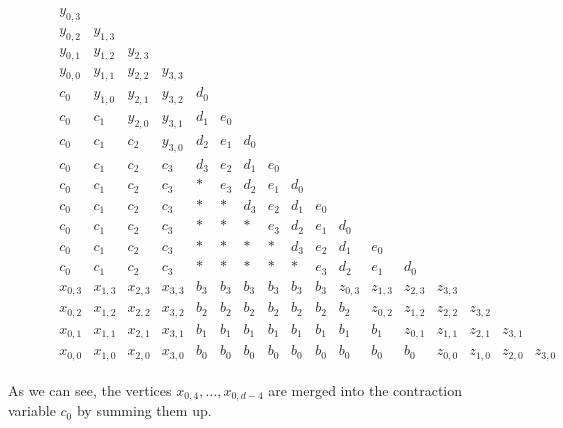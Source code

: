 \begin{figure}[H]
    \begin{align*}
        \begin{array}{cccccccccccccccccccc}
            y_{0,3} & & & & & & & & & & & & \\
            y_{0,2} & y_{1,3} & & & & & & & & & & & \\
            y_{0,1} & y_{1,2} & y_{2,3} & & & & & & & & & & \\
            y_{0,0} & y_{1,1} & y_{2,2} & y_{3,3} & & & & & & & & & \\
            c_0 & y_{1,0} & y_{2,1} & y_{3,2} & d_0 & & & & & & & & \\
            c_0 & c_1 & y_{2,0} & y_{3,1} & d_1 & e_0 & & & & & & & \\
            c_0 & c_1 & c_2 & y_{3,0} & d_2 & e_1 & d_0 & & & & & & \\
            c_0 & c_1 & c_2 & c_3 & d_3 & e_2 & d_1 & e_0 & & & & & \\
            c_0 & c_1 & c_2 & c_3 &  *  & e_3 & d_2 & e_1 & d_0 & & & & \\
            c_0 & c_1 & c_2 & c_3 &  *  & * & d_3 & e_2 & d_1 & e_0 & & & \\
            c_0 & c_1 & c_2 & c_3 &  *  & * & * & e_3 & d_2 & e_1 & d_0 & & \\
            c_0 & c_1 & c_2 & c_3 &  *  & * & * & * & d_3 & e_2 & d_1 & e_0 & \\
            c_0 & c_1 & c_2 & c_3 &  *  & * & * & * & * & e_3 & d_2 & e_1 & d_0 \\
            x_{0,3} & x_{1,3} & x_{2,3} & x_{3,3} & b_3 & b_3 & b_3 & b_3 & b_3 & b_3 & z_{0,3} & z_{1,3} & z_{2,3} & z_{3,3} \\
            x_{0,2} & x_{1,2} & x_{2,2} & x_{3,2} & b_2 & b_2 & b_2 & b_2 & b_2 & b_2 & b_2 & z_{0,2} & z_{1,2} & z_{2,2} & z_{3,2} \\
            x_{0,1} & x_{1,1} & x_{2,1} & x_{3,1} & b_1 & b_1 & b_1 & b_1 & b_1 & b_1 & b_1 & b_1 & z_{0,1} & z_{1,1} & z_{2,1} & z_{3,1} \\
            x_{0,0} & x_{1,0} & x_{2,0} & x_{3,0} & b_0 & b_0 & b_0 & b_0 & b_0 & b_0 & b_0 & b_0 & b_0 & z_{0,0} & z_{1,0} & z_{2,0} & z_{3,0}
        \end{array}
    \end{align*}  
\end{figure}

As we can see, the vertices \( x_{0,4}, \dots, x_{0, d-4} \) are merged into the contraction variable \( c_0 \) by summing them up. 

